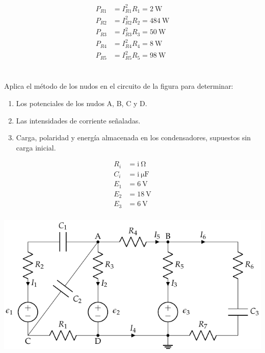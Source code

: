 \documentclass[10pt]{article}
\begin{document}
\begin{align*}
P_{R1} &= I^2_{R1} R_1 = \SI{2}{\watt}\\
P_{R2} &= I^2_{R2} R_2 = \SI{484}{\watt}\\
P_{R3} &= I^2_{R3} R_3 = \SI{50}{\watt}\\
P_{R4} &= I^2_{R4} R_4 = \SI{8}{\watt}\\
P_{R5} &= I^2_{R5} R_5 = \SI{98}{\watt}
\end{align*}

\clearpage

\section{}
Aplica el método de los nudos en el circuito de la figura para determinar:
\begin{enumerate}
\item Los potenciales de los nudos A, B, C y D.
\item Las intensidades de corriente señaladas.
\item Carga, polaridad y energía almacenada en los condensadores,
  supuestos sin carga inicial.
\end{enumerate}

\begin{minipage}[c]{0.3\textwidth}
  \begin{align*}
    R_i &= \mathrm{i\ } \si{\ohm}\\
    C_i &= \mathrm{i\ } \si{\micro\farad}\\
    E_1 &= \SI{6}{\volt}\\
    E_2 &= \SI{18}{\volt}\\
    E_3 &= \SI{6}{\volt}\\
  \end{align*}
\end{minipage}
\begin{minipage}[c]{0.7\textwidth}
  \includegraphics[width=\textwidth]{figs/nudos_condensadores.pdf}
\end{minipage}
\end{document}
